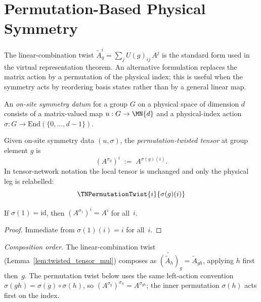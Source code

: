 \section{Permutation-Based Physical Symmetry}

The linear-combination twist $\widetilde{A}_g^i = \sum_j U(g)_{ij}\, A^j$
is the standard form used in the virtual representation theorem.
An alternative formulation replaces the matrix action by a permutation of the
physical index; this is useful when the symmetry acts by reordering
basis states rather than by a general linear map.

\begin{definition}\label{def:on_site_symmetry_perm}
    \leanok
    An \emph{on-site symmetry datum} for a group $G$ on a physical
    space of dimension $d$ consists of a matrix-valued map
    $u : G \to \MN{d}$ and a physical-index action
    $\sigma : G \to \mathrm{End}(\{0,\ldots,d{-}1\})$.
\end{definition}

\begin{definition}\label{def:perm_twisted_tensor}
    \leanok
    Given on-site symmetry data $(u, \sigma)$, the
    \emph{permutation-twisted tensor} at group element $g$ is
    \[
        (A^{\sigma_g})^i \;:=\; A^{\sigma(g)(i)}.
    \]
    In tensor-network notation the local tensor is unchanged and only the
    physical leg is relabelled:
    \[
        \TNPermutationTwist{i}{\sigma(g)(i)}
    \]
\end{definition}

\begin{lemma}\label{lem:perm_twisted_one}
    \leanok
    If $\sigma(1) = \mathrm{id}$, then $(A^{\sigma_1})^i = A^i$ for all~$i$.
\end{lemma}

\begin{proof}\leanok{}
    Immediate from $\sigma(1)(i) = i$ for all~$i$.
\end{proof}

\noindent\emph{Composition order.}
The linear-combination twist (Lemma~\ref{lem:twisted_tensor_mul}) composes as
$\widetilde{(\widetilde{A}_h)}_g = \widetilde{A}_{gh}$, applying $h$ first
then~$g$.  The permutation twist below uses the same left-action convention
$\sigma(gh) = \sigma(g) \circ \sigma(h)$, so
$(A^{\sigma_g})^{\sigma_h} = A^{\sigma_{gh}}$; the inner permutation $\sigma(h)$
acts first on the index.

